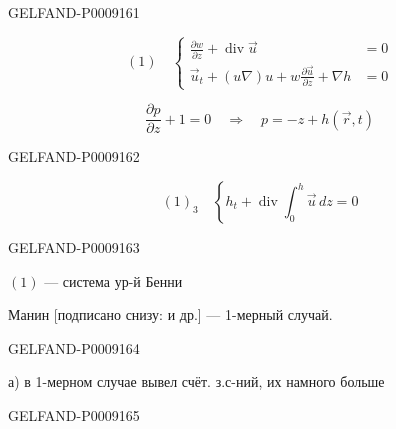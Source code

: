 \begin{GelfandAdjacentEvidence}{GELFAND-P000916}{1}

\begin{equation*}
 (1)\quad\left\{
 \begin{aligned}
 \frac{\partial w}{\partial z}+\operatorname{div}\vec u&=0\\
 \vec u_t+(u\nabla)u+w\frac{\partial\vec u}{\partial z}+\nabla h&=0
 \end{aligned}\right.
\end{equation*}

\begin{equation*}
 \frac{\partial p}{\partial z}+1=0
 \quad\Longrightarrow\quad p=-z+h(\vec r,t)
\end{equation*}
\end{GelfandAdjacentEvidence}
\begin{GelfandAdjacentEvidence}{GELFAND-P000916}{2}


\begin{equation*}
 (1)_3\quad\left\{h_t+\operatorname{div}\int_0^h\vec u\,dz=0\right.
\end{equation*}
\end{GelfandAdjacentEvidence}
\begin{GelfandAdjacentEvidence}{GELFAND-P000916}{3}


$(1)$ --- система ур-й Бенни

Манин [подписано снизу: и др.] --- 1-мерный случай.
\end{GelfandAdjacentEvidence}
\begin{GelfandAdjacentEvidence}{GELFAND-P000916}{4}


 а) в 1-мерном случае вывел счёт. з.с-ний, их намного больше
\end{GelfandAdjacentEvidence}
\begin{GelfandAdjacentEvidence}{GELFAND-P000916}{5}

\end{GelfandAdjacentEvidence}
